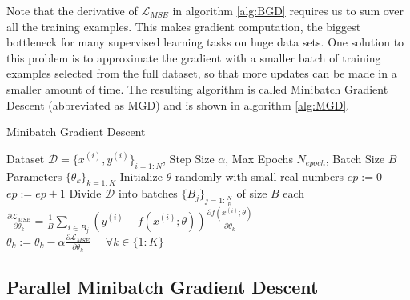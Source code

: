 Note that the derivative of $\mathcal{L}_{MSE}$ in algorithm \ref{alg:BGD} requires us to sum over all the training examples.
This makes gradient computation, the biggest bottleneck for many supervised learning tasks on huge data sets.
One solution to this problem is to approximate the gradient with a smaller batch of training examples selected from the full dataset, so that more updates can be made in a smaller amount of time.
The resulting algorithm is called Minibatch Gradient Descent (abbreviated as MGD) and is shown in algorithm \ref{alg:MGD}.
\begin{algorithm}[tb]
   \caption{Minibatch Gradient Descent}
   \label{alg:MGD}
\begin{algorithmic}
    Dataset $\mathcal{D} = \{x^{(i)},y^{(i)}\}_{i=1:N}$, Step Size $\alpha$, Max Epochs $N_{epoch}$, Batch Size $B$
    Parameters $\{\theta_k\}_{k=1:K}$
   \STATE
   \STATE Initialize $\theta$ randomly with small real numbers
   \STATE $ep := 0$
   \REPEAT
   \STATE $ep := ep + 1$
   \STATE Divide $\mathcal{D}$ into batches $\{B_j\}_{j=1:\frac{N}{B}}$ of size $B$ each
   \STATE $\frac{\partial \mathcal{L}_{MSE}}{\partial \theta_k} = \frac{1}{B} \sum_{i \in B_j} ( y^{(i)} - f(x^{(i)}; \theta)) \frac{\partial f(x^{(i)}; \theta)}{\partial \theta_k}$
   \ENDFOR
   \STATE $\theta_k := \theta_k - \alpha \frac{\partial \mathcal{L}_{MSE}}{\partial \theta_k} \hspace{16pt} \forall k \in \{1:K\}$
   \ENDFOR
\end{algorithmic}
\end{algorithm}

\subsection{Parallel Minibatch Gradient Descent}
\label{sub:PMGD}

